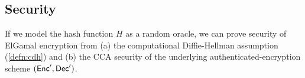 \subsection{Security}
If we model the hash function $H$ as a random oracle, 
we can prove security of ElGamal encryption from 
(a) the computational Diffie-Hellman assumption (\cref{defn:cdh}) and
(b) the CCA security of the underlying authenticated-encryption
scheme $(\mathsf{Enc}', \mathsf{Dec}')$.

